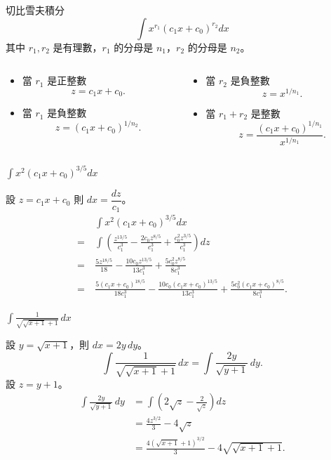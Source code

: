 \documentclass{beamer}
\theoremstyle{remark}
\begin{document}
\begin{frame}{切比雪夫積分}
  \[\int x^{r_1} \left( c_1 x + c_0 \right)^{r_2} dx\]
  其中 $r_1, r_2$ 是有理數，$r_1$ 的分母是 $n_1$，$r_2$ 的分母是 $n_2$。
  \begin{columns}
    \begin{column}[t]{0.5\textwidth}
      \begin{itemize}
	\item 當 $r_1$ 是正整數
	  \[z = c_1 x + c_0.\]
	\item 當 $r_1$ 是負整數
	  \[z = \left( c_1 x + c_0 \right)^{1/n_2}.\]
      \end{itemize}
    \end{column}
    \begin{column}[t]{0.5\textwidth}
      \begin{itemize}
	\item 當 $r_2$ 是負整數
	  \[z = x^{1/n_1}.\]
	\item 當 $r_1 + r_2$ 是整數
	  \[z = \frac{\left( c_1 x + c_0 \right)^{1/n_1}}{x^{1/n_1}}.\]
      \end{itemize}
    \end{column}
  \end{columns}
\end{frame}

\begin{frame}{$\displaystyle \int x^2 \left( c_1 x + c_0 \right)^{3/5} dx$}
  \begin{solution}
    設 $z = c_1 x + c_0$ 則 $dx = \dfrac{dz}{c_1}$。
    \begin{align*}
	 & \int x^2 \left( c_1 x + c_0 \right)^{3/5} dx\\
      =\:& \int \left( \frac{z^{13/5}}{c_1^3} - \frac{2 c_0 z^{8/5}}{c_1^3}
	  + \frac{c_0^2 z^{3/5}}{c_1^3} \right) dz\\
      =\:& \frac{5z^{18/5}}{18} - \frac{10 c_0 z^{13/5}}{13 c_1^3} + \frac{5 c_0^2 z^{8/5}}{8 c_1^3}\\
      =\:& \frac{5 \left( c_1 x + c_0 \right)^{18/5}}{18 c_1^3}
	  - \frac{10 c_0 \left( c_1 x + c_0 \right)^{13/5}}{13 c_1^3}
	  + \frac{5 c_0^2 \left( c_1 x + c_0 \right)^{8/5}}{8 c_1^3}.
    \end{align*}
  \end{solution}
\end{frame}

\begin{frame}{$\displaystyle \int \frac{1}{\sqrt{\sqrt{x+1}+1}}\,dx$}
  \begin{solution}
    設 $y = \sqrt{x+1}$，則 $dx = 2y\,dy$。
    \[\int \frac{1}{\sqrt{\sqrt{x+1}+1}}\,dx = \int \frac{2y}{\sqrt{y+1}}\,dy.\]
    設 $z = y+1$。
    \begin{align*}
      \int \frac{2y}{\sqrt{y+1}}\,dy &= \int \left( 2 \sqrt z - \frac{2}{\sqrt z} \right) dz\\
	&= \frac{4z^{3/2}}{3} - 4 \sqrt z\\
	&= \frac{4 \left( \sqrt{x+1}+1 \right)^{3/2}}{3} - 4 \sqrt{\sqrt{x+1}+1}.
    \end{align*}
  \end{solution}
\end{frame}
\end{document}
